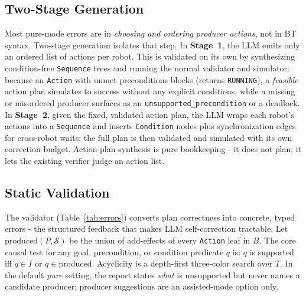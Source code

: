 \documentclass[journal]{IEEEtran}
\newcommand{\pred}[1]{\texttt{#1}}
\begin{document}
\subsection{Two-Stage Generation}
\label{sec:twostage}
Most pure-mode errors are in \emph{choosing and ordering producer actions}, not in BT syntax. Two-stage generation isolates that step. In \textbf{Stage~1}, the LLM emits only an ordered list of actions per robot. This is validated on its own by synthesizing condition-free \pred{Sequence} trees and running the normal validator and simulator: because an \pred{Action} with unmet preconditions blocks (returns \pred{RUNNING}), a \emph{feasible} action plan simulates to success without any explicit conditions, while a missing or misordered producer surfaces as an \pred{unsupported\_precondition} or a deadlock. In \textbf{Stage~2}, given the fixed, validated action plan, the LLM wraps each robot's actions into a \pred{Sequence} and inserts \pred{Condition} nodes plus synchronization edges for cross-robot waits; the full plan is then validated and simulated with its own correction budget. Action-plan synthesis is pure bookkeeping - it does not plan; it lets the existing verifier judge an action list.

\subsection{Static Validation}
\label{sec:validation}
The validator (Table~\ref{tab:errors}) converts plan correctness into concrete, typed errors - the structured feedback that makes LLM self-correction tractable. Let $\mathrm{produced}(P,\mathcal{S})$ be the union of add-effects of every \pred{Action} leaf in $B$. The core causal test for any goal, precondition, or condition predicate $q$ is: $q$ is supported iff $q\in I$ or $q\in\mathrm{produced}$. Acyclicity is a depth-first three-color search over $T$. In the default \emph{pure} setting, the report states \emph{what} is unsupported but never names a candidate producer; producer suggestions are an assisted-mode option only.
\end{document}
